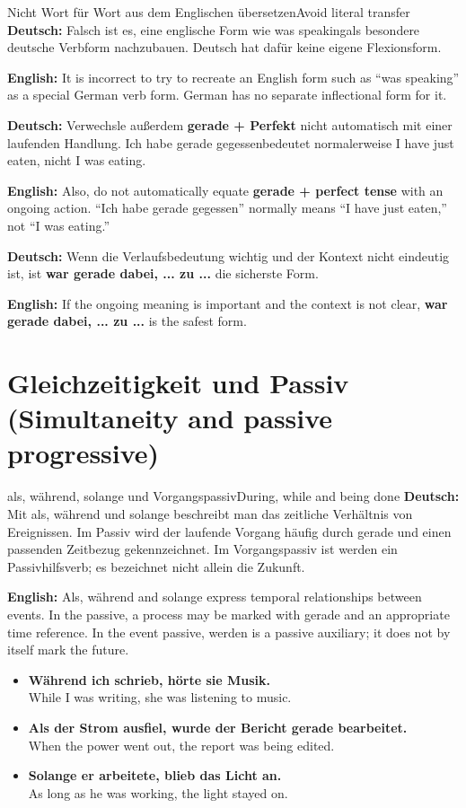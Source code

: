 \documentclass[a4paper,11pt]{article}
\newcommand{\GermanText}[1]{\textbf{Deutsch: }#1\par}
\newcommand{\EnglishText}[1]{{\small\color{SoftGray}\textbf{English: }#1\par}}
\newcommand{\ExampleItem}[2]{\item \textbf{#1}\\{\small\color{SoftGray}#2}}
\begin{document}
        \begin{grammarentry}{Nicht Wort für Wort aus dem Englischen übersetzen}{Avoid literal transfer}
            \GermanText{Falsch ist es, eine englische Form wie \glqq was speaking\grqq als besondere deutsche Verbform nachzubauen. Deutsch hat dafür keine eigene Flexionsform.}
            \EnglishText{It is incorrect to try to recreate an English form such as ``was speaking'' as a special German verb form. German has no separate inflectional form for it.}

            \GermanText{Verwechsle außerdem \textbf{gerade + Perfekt} nicht automatisch mit einer laufenden Handlung. \glqq Ich habe gerade gegessen\grqq bedeutet normalerweise \glqq I have just eaten\grqq, nicht \glqq I was eating\grqq.}
            \EnglishText{Also, do not automatically equate \textbf{gerade + perfect tense} with an ongoing action. ``Ich habe gerade gegessen'' normally means ``I have just eaten,'' not ``I was eating.''}

            \GermanText{Wenn die Verlaufsbedeutung wichtig und der Kontext nicht eindeutig ist, ist \textbf{war gerade dabei, ... zu ...} die sicherste Form.}
            \EnglishText{If the ongoing meaning is important and the context is not clear, \textbf{war gerade dabei, ... zu ...} is the safest form.}
        \end{grammarentry}

\section{Gleichzeitigkeit und Passiv \textnormal{(Simultaneity and passive progressive)}}
\begin{grammarentry}{als, während, solange und Vorgangspassiv}{During, while and being done}
\GermanText{Mit als, während und solange beschreibt man das zeitliche Verhältnis von Ereignissen. Im Passiv wird der laufende Vorgang häufig durch gerade und einen passenden Zeitbezug gekennzeichnet. Im Vorgangspassiv ist werden ein Passivhilfsverb; es bezeichnet nicht allein die Zukunft.}
\EnglishText{Als, während and solange express temporal relationships between events. In the passive, a process may be marked with gerade and an appropriate time reference. In the event passive, werden is a passive auxiliary; it does not by itself mark the future.}
\end{grammarentry}
\begin{exbox}
\begin{itemize}
\ExampleItem{Während ich schrieb, hörte sie Musik.}{While I was writing, she was listening to music.}
\ExampleItem{Als der Strom ausfiel, wurde der Bericht gerade bearbeitet.}{When the power went out, the report was being edited.}
\ExampleItem{Solange er arbeitete, blieb das Licht an.}{As long as he was working, the light stayed on.}
\end{itemize}
\end{exbox}
\end{document}
